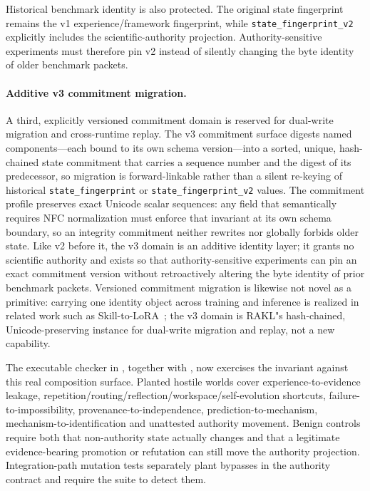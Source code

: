 Historical benchmark identity is also protected.  The original state fingerprint remains the v1 experience/framework fingerprint, while \texttt{state\_fingerprint\_v2} explicitly includes the scientific-authority projection.  Authority-sensitive experiments must therefore pin v2 instead of silently changing the byte identity of older benchmark packets.

\paragraph{Additive v3 commitment migration.}
A third, explicitly versioned commitment domain is reserved for dual-write migration and cross-runtime replay. The v3 commitment surface digests named components---each bound to its own schema version---into a sorted, unique, hash-chained state commitment that carries a sequence number and the digest of its predecessor, so migration is forward-linkable rather than a silent re-keying of historical \texttt{state\_fingerprint} or \texttt{state\_fingerprint\_v2} values. The commitment profile preserves exact Unicode scalar sequences: any field that semantically requires NFC normalization must enforce that invariant at its own schema boundary, so an integrity commitment neither rewrites nor globally forbids older state. Like v2 before it, the v3 domain is an additive identity layer; it grants no scientific authority and exists so that authority-sensitive experiments can pin an exact commitment version without retroactively altering the byte identity of prior benchmark packets. Versioned commitment migration is likewise not novel as a primitive: carrying one identity object across training and inference is realized in related work such as Skill-to-LoRA~\cite{zhang2026skill2lora}; the v3 domain is RAKL"s hash-chained, Unicode-preserving instance for dual-write migration and replay, not a new capability.

\begin{sloppypar}
The executable checker in , together with , now exercises the invariant against this real composition surface.  Planted hostile worlds cover experience-to-evidence leakage, repetition/routing/reflection/workspace/self-evolution shortcuts, failure-to-impossibility, provenance-to-independence, prediction-to-mechanism, mechanism-to-identification and unattested authority movement.  Benign controls require both that non-authority state actually changes and that a legitimate evidence-bearing promotion or refutation can still move the authority projection.  Integration-path mutation tests separately plant bypasses in the authority contract and require the suite to detect them.
\end{sloppypar}

